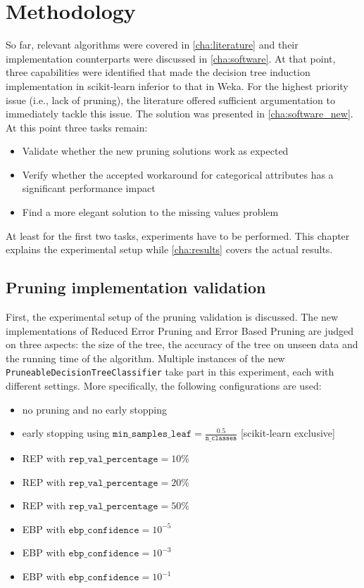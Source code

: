 \chapter{Methodology}\label{cha:method}
So far, relevant algorithms were covered in \autoref{cha:literature} and their implementation counterparts were discussed in \autoref{cha:software}. At that point, three capabilities were identified that made the decision tree induction implementation in scikit-learn inferior to that in Weka. For the highest priority issue (i.e., lack of pruning), the literature offered sufficient argumentation to immediately tackle this issue. The solution was presented in \autoref{cha:software_new}. At this point three tasks remain:
\begin{itemize}
    \item Validate whether the new pruning solutions work as expected
    \item Verify whether the accepted workaround for categorical attributes has a significant performance impact
    \item Find a more elegant solution to the missing values problem
\end{itemize}

At least for the first two tasks, experiments have to be performed. This chapter explains the experimental setup while \autoref{cha:results} covers the actual results.


\section{Pruning implementation validation}
First, the experimental setup of the pruning validation is discussed. The new implementations of Reduced Error Pruning and Error Based Pruning are judged on three aspects: the size of the tree, the accuracy of the tree on unseen data and the running time of the algorithm. Multiple instances of the new \texttt{PruneableDecisionTreeClassifier} take part in this experiment, each with different settings. More specifically, the following configurations are used:

\begin{itemize}
    \item no pruning and no early stopping
    \item early stopping using $\texttt{min\_samples\_leaf} = \frac{0.5}{\texttt{n\_classes}}$ [scikit-learn exclusive]
    \item REP with $\texttt{rep\_val\_percentage} = 10\%$
    \item REP with $\texttt{rep\_val\_percentage} = 20\%$
    \item REP with $\texttt{rep\_val\_percentage} = 50\%$
    \item EBP with $\texttt{ebp\_confidence} = 10^{-5}$
    \item EBP with $\texttt{ebp\_confidence} = 10^{-3}$
    \item EBP with $\texttt{ebp\_confidence} = 10^{-1}$
\end{itemize}

